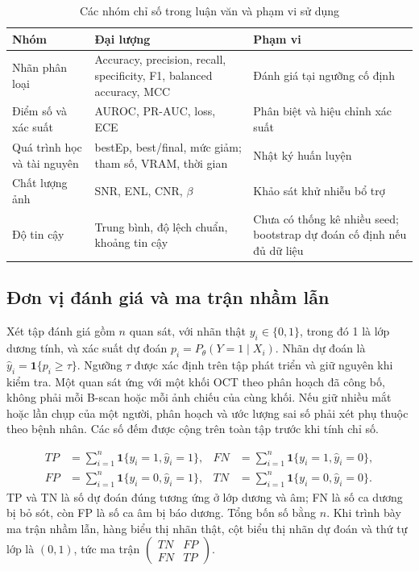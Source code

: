 \begin{table}[htbp]
  \centering
  \caption{Các nhóm chỉ số trong luận văn và phạm vi sử dụng}
  \label{tab:variables}
  \begin{tabular}{@{}>{\RaggedRight\arraybackslash}p{}>{\RaggedRight\arraybackslash}p{}>{\RaggedRight\arraybackslash}p{}@{}}
    \toprule
    Nhóm & Đại lượng & Phạm vi\\ \midrule
    Nhãn phân loại & Accuracy, precision, recall, specificity, F1, balanced accuracy, MCC & Đánh giá tại ngưỡng cố định\\
    Điểm số và xác suất & AUROC, PR-AUC, loss, ECE & Phân biệt và hiệu chỉnh xác suất\\
    Quá trình học và tài nguyên & bestEp, best/final, mức giảm; tham số, VRAM, thời gian & Nhật ký huấn luyện\\
    Chất lượng ảnh & SNR, ENL, CNR, $\beta$ & Khảo sát khử nhiễu bổ trợ\\
    Độ tin cậy & Trung bình, độ lệch chuẩn, khoảng tin cậy & Chưa có thống kê nhiều seed; bootstrap dự đoán cố định nếu đủ dữ liệu\\
    \bottomrule
  \end{tabular}
\end{table}

\subsection{Đơn vị đánh giá và ma trận nhầm lẫn}
Xét tập đánh giá gồm $n$ quan sát, với nhãn thật $y_i\in\{0,1\}$,
trong đó 1 là lớp dương tính, và xác suất dự đoán $p_i=P_\theta(Y=1\mid X_i)$.
Nhãn dự đoán là $\widehat y_i=\mathbf 1\{p_i\geq\tau\}$.
Ngưỡng $\tau$ được xác định trên tập phát triển và giữ nguyên khi kiểm tra.
Một quan sát ứng với một khối OCT theo phân hoạch đã công bố, không phải
mỗi B-scan hoặc mỗi ảnh chiếu của cùng khối. Nếu giữ nhiều mắt hoặc lần
chụp của một người, phân hoạch và ước lượng sai số phải xét phụ thuộc theo
bệnh nhân. Các số đếm được cộng trên toàn tập trước khi tính chỉ số.

\begin{equation}
\begin{aligned}
 TP&=\sum_{i=1}^{n}\mathbf 1\{y_i=1,\widehat y_i=1\},&
 FN&=\sum_{i=1}^{n}\mathbf 1\{y_i=1,\widehat y_i=0\},\\
 FP&=\sum_{i=1}^{n}\mathbf 1\{y_i=0,\widehat y_i=1\},&
 TN&=\sum_{i=1}^{n}\mathbf 1\{y_i=0,\widehat y_i=0\}.
\end{aligned}
\label{eq:metric-confusion}
\end{equation}
TP và TN là số dự đoán đúng tương ứng ở lớp dương và âm; FN là số ca
dương bị bỏ sót, còn FP là số ca âm bị báo dương. Tổng bốn số bằng $n$.
Khi trình bày ma trận nhầm lẫn, hàng biểu thị nhãn thật, cột biểu thị nhãn
dự đoán và thứ tự lớp là $(0,1)$, tức ma trận
$\left(\begin{smallmatrix}TN&FP\\FN&TP\end{smallmatrix}\right)$.

